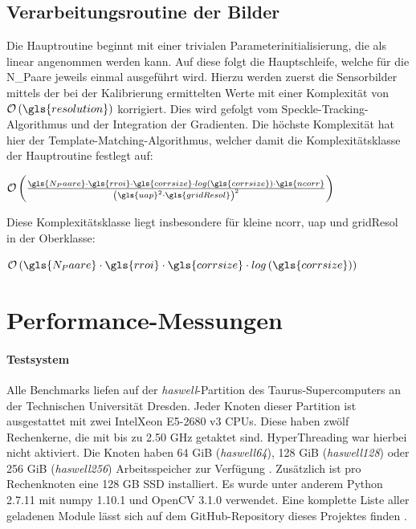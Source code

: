\subsection{Verarbeitungsroutine der Bilder}

Die Hauptroutine beginnt mit einer trivialen Parameterinitialisierung, die als linear angenommen werden kann. Auf diese folgt die Hauptschleife, welche für die \gls{N_Paare} jeweils einmal ausgeführt wird. Hierzu werden zuerst die Sensorbilder mittels der bei der Kalibrierung ermittelten Werte mit einer Komplexität von $\mathcal{O}\left(\gls{resolution}\right)$ korrigiert. Dies wird gefolgt vom Speckle-Tracking-Algorithmus und der Integration der Gradienten. Die höchste Komplexität hat hier der Template-Matching-Algorithmus, welcher damit die Komplexitätsklasse der Hauptroutine festlegt auf:

\begin{center}
	$\mathcal{O}\left(\frac{\gls{N_Paare} \cdot\gls{rroi} \cdot \gls{corrsize} \cdot log\left(\gls{corrsize}\right) \cdot \gls{ncorr}}{\left(\gls{uap}^2 \cdot \gls{gridResol}\right)^2}\right)$
\end{center}

Diese Komplexitätsklasse liegt insbesondere für kleine \gls{ncorr}, \gls{uap} und \gls{gridResol} in der Oberklasse:

\begin{center}
	$\mathcal{O}\left(\gls{N_Paare} \cdot \gls{rroi} \cdot \gls{corrsize} \cdot log\left(\gls{corrsize}\right)\right)$
\end{center}

\section{Performance-Messungen}

\paragraph{Testsystem}

\begin{sloppypar}
Alle Benchmarks liefen auf der \textit{haswell}-Partition des Taurus-Supercomputers an der Technischen Universität Dresden. Jeder Knoten dieser Partition ist ausgestattet mit zwei Intel\textregistered \mbox{Xeon} E5-2680 v3 \glspl{CPU}. Diese haben zwölf Rechenkerne, die mit bis zu 2.50 \gls{GHz} getaktet sind. HyperThreading war hierbei nicht aktiviert. Die Knoten haben 64 \gls{GiB} (\textit{haswell64}), 128 \gls{GiB} (\textit{haswell128}) oder 256 \gls{GiB} (\textit{haswell256}) Arbeitsspeicher zur Verfügung \cite{Mar17}. Zusätzlich ist pro Rechenknoten eine 128 \gls{GB} \gls{SSD} installiert. Es wurde unter anderem Python 2.7.11 mit numpy 1.10.1 und OpenCV 3.1.0 verwendet. Eine komplette Liste aller geladenen Module lässt sich auf dem GitHub-Repository dieses Projektes finden \cite{Sch18a}.
\end{sloppypar}

